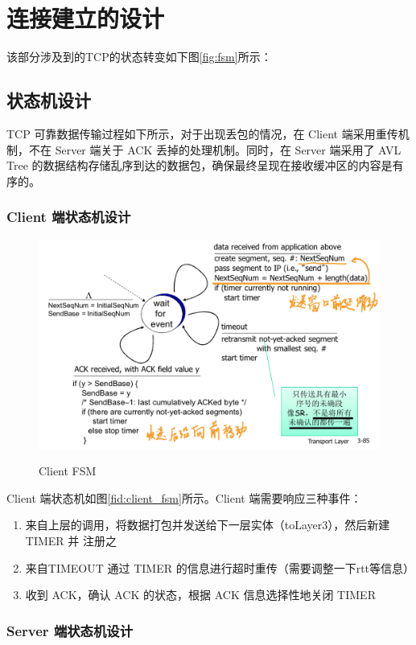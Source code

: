 
\chapter{连接建立的设计}
该部分涉及到的TCP的状态转变如下图\ref{fig:fsm}所示：

\section{状态机设计}

TCP 可靠数据传输过程如下所示，对于出现丢包的情况，在 Client 端采用重传机制，不在 Server 端关于 ACK 丢掉的处理机制。同时，在 Server 端采用了 AVL Tree 的数据结构存储乱序到达的数据包，确保最终呈现在接收缓冲区的内容是有序的。

\subsection{Client 端状态机设计}

\begin{figure}[!htbp]
    \centering
    \includegraphics[width=.8\textwidth]{figures/CLIENT_FSM.png}
    \label{fig:client_fsm}\caption{Client FSM}
  \end{figure}

Client 端状态机如图\ref{fid:client_fsm}所示。Client 端需要响应三种事件：
\begin{enumerate}
    \item 来自上层的调用，将数据打包并发送给下一层实体（toLayer3），然后新建 TIMER 并 注册之
    \item 来自TIMEOUT 通过 TIMER 的信息进行超时重传（需要调整一下rtt等信息）
    \item 收到 ACK，确认 ACK 的状态，根据 ACK 信息选择性地关闭 TIMER 
\end{enumerate}

\subsection{Server 端状态机设计}

